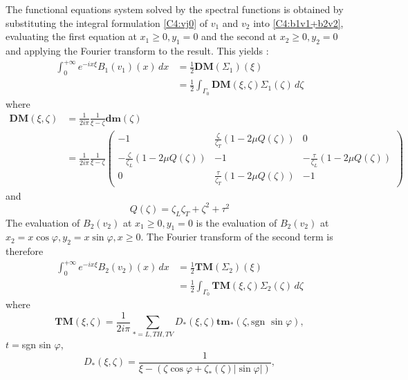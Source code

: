 The functional equations system solved by the spectral functions is obtained by substituting the integral formulation \eqref{C4:vj0} of $v_1$ and $v_2$ into \eqref{C4:b1v1+b2v2}, evaluating the first equation at $x_1\geq 0, y_1=0$ and the second at $x_2\geq 0, y_2=0$ and applying the Fourier transform to the result. This yields :
\begin{equation}
\begin{split}
\int_0^{+\infty} e^{-ix\xi}B_1(v_1)(x)\,dx&=\frac{1}{2}\textbf{DM}(\Sigma_1)(\xi) \\
&=\frac{1}{2} \int_{\Gamma_0}\textbf{DM}(\xi,\zeta)\Sigma_1(\zeta)\,d\zeta
\end{split}
\label{C4:B1DM}
\end{equation}
where
\begin{equation}
\begin{split}
\textbf{DM}(\xi,\zeta)&=\frac{1}{2i\pi} \frac{1}{\xi-\zeta} \textbf{dm}(\zeta) \\
&=\frac{1}{2i\pi} \frac{1}{\xi-\zeta} \begin{pmatrix}
-1 & \frac{\zeta}{\zeta_T}(1-2\mu Q(\zeta)) & 0\\
-\frac{\zeta}{\zeta_L}(1-2\mu Q(\zeta))  & -1&-\frac{\tau}{\zeta_L}(1-2\mu Q(\zeta)) \\
0&\frac{\tau}{\zeta_T}(1-2\mu Q(\zeta)) &-1
\end{pmatrix}
 \end{split}
\label{C4:defDM}
\end{equation}
and
\begin{equation}
Q(\zeta) =\zeta_L\zeta_T+\zeta^2+\tau^2
\end{equation}
The evaluation of $B_2(v_2)$ at $x_1\geq 0, y_1=0$ is the evaluation of  $B_2(v_2)$ at $x_2=x\cos\varphi, y_2=x\sin\varphi, x\geq 0$. The Fourier transform of the second term is therefore
\begin{equation}
\begin{split}
\int_0^{+\infty} e^{-ix\xi}B_2(v_2)(x)\,dx&=\frac{1}{2}\textbf{TM}(\Sigma_2)(\xi) \\
&=\frac{1}{2} \int_{\Gamma_0}\textbf{TM}(\xi,\zeta)\Sigma_2(\zeta)\,d\zeta
\end{split}
\label{C4:B2TM}
\end{equation}
where
\begin{equation}
\textbf{TM}(\xi,\zeta)=\frac{1}{2i\pi}\sum_{*=L,TH,TV}D_*(\xi,\zeta)\textbf{tm}_*(\zeta,\mbox{sgn } \sin \varphi),
\label{C4:defTM}
\end{equation}
$t=$sgn sin $\varphi$,
\begin{equation}
D_*(\xi,\zeta)=\frac{1}{\xi-(\zeta \cos \varphi + \zeta_*(\zeta) |\sin \varphi|)},
\end{equation}
